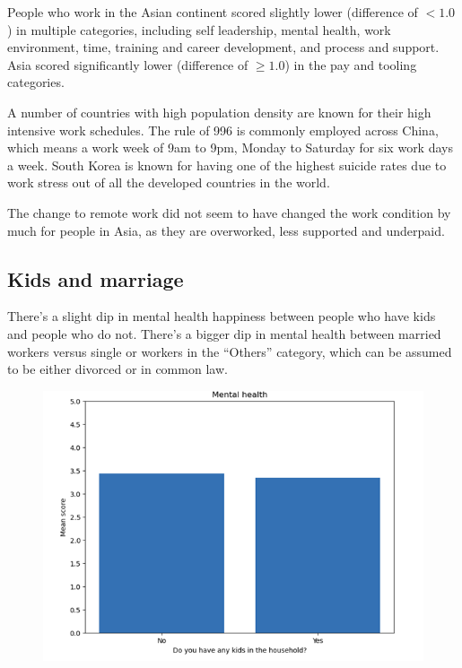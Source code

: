 \documentclass[12pt]{article}
\begin{document}
People who work in the Asian continent scored slightly lower (difference of $< 1.0$)  in multiple categories, including self leadership, mental health, work environment, time, training and career development, and process and support. Asia scored significantly lower (difference of $\geq 1.0$) in the pay and tooling categories. 

A number of countries with high population density are known for their high intensive work schedules. The rule of 996 is commonly employed across China, which means a work week of 9am to 9pm, Monday to Saturday for six work days a week. South Korea is known for having one of the highest suicide rates due to work stress out of all the developed countries in the world. \cite{suiciderate2022}

The change to remote work did not seem to have changed the work condition by much for people in Asia, as they are overworked, less supported and underpaid.

\subsection*{Kids and marriage}

There’s a slight dip in mental health happiness between people who have kids and people who do not. There’s a bigger dip in mental health between married workers versus single or workers in the “Others” category, which can be assumed to be either divorced or in common law.

\begin{figure}[h]
    \centering
    \includegraphics[scale=1]{kids.png}
    \label{kids}
\end{figure} \\
\end{document}
